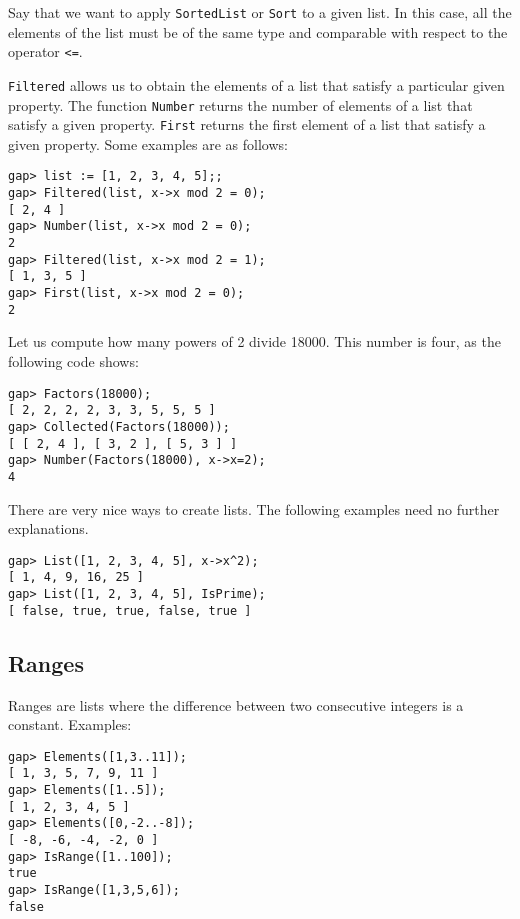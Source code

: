 \begin{remark}
  Say that we want to apply \lstinline{SortedList} or \lstinline{Sort} to a
  given list. In this case, all the elements of the list must be of the same
  type and comparable with respect to the operator \lstinline{<=}. 
\end{remark}

\lstinline{Filtered} allows us to obtain the elements of a list that satisfy a
particular given property.  The function \lstinline{Number} returns the number
of elements of a list  that satisfy a given property.  \lstinline{First}
returns the first element of a list that satisfy a given property. Some examples are as follows:
\begin{lstlisting}
gap> list := [1, 2, 3, 4, 5];;
gap> Filtered(list, x->x mod 2 = 0);
[ 2, 4 ]
gap> Number(list, x->x mod 2 = 0);
2
gap> Filtered(list, x->x mod 2 = 1);
[ 1, 3, 5 ]
gap> First(list, x->x mod 2 = 0);
2
\end{lstlisting}

\begin{example}
Let us compute how many powers of 2 divide 18000. This number is four, as
the following code shows:
\begin{lstlisting}
gap> Factors(18000);
[ 2, 2, 2, 2, 3, 3, 5, 5, 5 ]
gap> Collected(Factors(18000));
[ [ 2, 4 ], [ 3, 2 ], [ 5, 3 ] ]
gap> Number(Factors(18000), x->x=2);
4
\end{lstlisting}
\end{example}

There are very nice ways to create lists. The following examples need no
further explanations.
\begin{lstlisting}
gap> List([1, 2, 3, 4, 5], x->x^2);
[ 1, 4, 9, 16, 25 ]
gap> List([1, 2, 3, 4, 5], IsPrime);
[ false, true, true, false, true ]
\end{lstlisting}

\subsection*{Ranges} 

Ranges are lists where the difference between two
consecutive integers is a constant.  Examples:
\begin{lstlisting}
gap> Elements([1,3..11]);
[ 1, 3, 5, 7, 9, 11 ]
gap> Elements([1..5]);
[ 1, 2, 3, 4, 5 ]
gap> Elements([0,-2..-8]);
[ -8, -6, -4, -2, 0 ]
gap> IsRange([1..100]);
true
gap> IsRange([1,3,5,6]);
false
\end{lstlisting}

